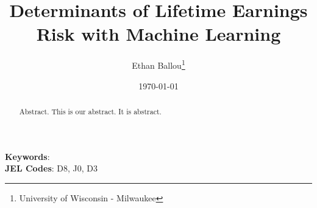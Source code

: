 \documentclass[12pt]{article}
\title{Determinants of Lifetime Earnings Risk with Machine Learning}
\author{Ethan Ballou\thanks{University of Wisconsin - Milwaukee}}
\date{\today}
\begin{document}
\maketitle
\thispagestyle{empty}



\begin{abstract}
\begin{singlespace}
\noindent 
Abstract.  This is our abstract.  It is abstract.  
\end{singlespace}
\end{abstract}
\noindent
\textbf{Keywords}: \\
\textbf{JEL Codes}: D8, J0, D3\\






\clearpage
\setcounter{page}{1}
\end{document}
